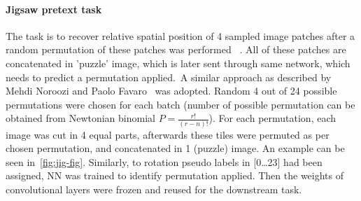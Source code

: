 \paragraph{Jigsaw pretext task}
The task is
to recover relative spatial position of 4 sampled image patches
after a random permutation of these patches was performed
~\cite{kolesnikov2019revisiting}.
All of these patches are concatenated in 'puzzle' image,
which is later sent through same network, which needs to predict a permutation applied.\
A similar approach as described by Mehdi Noroozi and Paolo Favaro~\cite{DBLP:journals/corr/NorooziF16} was adopted.
Random 4 out of 24 possible permutations were chosen for each batch
(number of possible permutation can be obtained from Newtonian binomial $P=\frac{r!}{(r-n)!}$).
For each permutation, each image was cut in 4 equal parts,
afterwards these tiles were permuted as per chosen permutation, and concatenated in 1 (puzzle) image.
An example can be seen in~\ref{fig:jig-fig}.
Similarly, to rotation pseudo labels in [0\ldots23] had been assigned,
NN was trained to identify permutation applied.
Then the weights of convolutional layers were frozen and reused for the downstream task.

